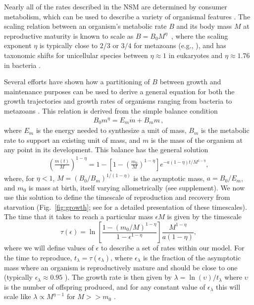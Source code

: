 \documentclass{pnastwo}
\begin{document}
\begin{article}
Nearly all of the rates described in the NSM are determined by consumer
metabolism, which can be used to describe a variety of organismal features
\cite{Brown:2004wq}.  The scaling relation between an organism's metabolic
rate $B$ and its body mass $M$ at reproductive maturity is known to scale as
$B = B_0 M^\eta$~\cite{West:2002it}, where the scaling exponent $\eta$ is
typically close to $2/3$ or $3/4$ for metazoans (e.g., \cite{Brown:2004wq}),
and has taxonomic shifts for unicellular species between $\eta\approx 1$ in
eukaryotes and $\eta\approx 1.76$ in bacteria
\cite{DeLong:2010dy,Kempes:2012hy}.

Several efforts have shown how a partitioning of $B$ between growth and
maintenance purposes can be used to derive a general equation for both the
growth trajectories and growth rates of organisms ranging from bacteria to
metazoans
\cite{West:2001bv,moses2008rmo,gillooly2002esa,hou,Kempes:2012hy}. This relation is derived from the simple balance condition \cite{West:2001bv,moses2008rmo,gillooly2002esa,hou,Kempes:2012hy}
\begin{eqnarray}
\label{balance}
B_{0}m^{\eta}=E_{m}\dot{m}+B_{m}m\,,
\end{eqnarray}
where $E_{m}$ is the energy needed to synthesize a unit of mass, $B_{m}$ is
the metabolic rate to support an existing unit of mass, and $m$ is the mass
of the organism at any point in its development.  This balance has the
general solution \cite{bettencourt,Kempes:2012hy}
\begin{eqnarray}
\label{m1}
\left(\frac{m\left(t\right)}{M}\right)^{1-\eta}\!=1\!-\!\left[1\!-\!\left(\frac{m_{0}}{M}\right)^{1\!-\!\eta}\right]e^{-a\left(1\!-\!\eta\right)t/M^{1-\eta}},
\end{eqnarray}
where, for $\eta<1$, $M=(B_{0}/B_{m})^{1/(1-\eta)}$ is the asymptotic mass, $a=B_{0}/E_{m}$, and $m_0$ is mass at birth, itself varying allometrically (see supplement).  We now use this solution to define the timescale of reproduction and recovery from starvation (Fig.~\ref{fig:growth}; see \cite{moses2008rmo} for a detailed presentation of these timescales). The time that it takes to reach a particular mass $\epsilon M$ is given by the timescale
\begin{equation}
\label{t1}
\tau\left(\epsilon\right) = \ln\left[\frac{1-\left(m_{0}/M\right)^{1-\eta}}{1-\epsilon^{1-\eta}}\right]\frac{M^{1-\eta}}{a\left(1-\eta\right)},
\end{equation}
where we will define values of $\epsilon$ to describe a set of rates within our model. For the time to reproduce, $t_{\lambda}=\tau\left(\epsilon_{\lambda}\right)$, where $\epsilon_{\lambda}$ is the fraction of the asymptotic mass where an organism is reproductively mature and should be close to one (typically $\epsilon_{\lambda}\approx0.95$ \cite{West:2001bv}). The growth rate is then given by $\lambda=\ln\left(\upsilon\right)/t_{\lambda}$ where $\upsilon$ is the number of offspring produced, and for any constant value of $\epsilon_{\lambda}$ this will scale like $\lambda\propto M^{\eta-1}$ for $M>>m_{0}$ \cite{West:2001bv,moses2008rmo,gillooly2002esa,hou,Kempes:2012hy}.



\end{article}
\end{document}
